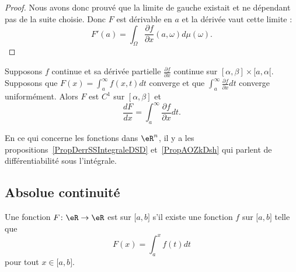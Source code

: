 \begin{proof}
        Nous avons donc prouvé que la limite de gauche existait et ne dépendant pas de la suite choisie. Donc \( F\) est dérivable en \( a\) et la dérivée vaut cette limite :
        \begin{equation}
            F'(a)=\int_{\Omega}\frac{ \partial f }{ \partial x }(a,\omega)d\mu(\omega).
        \end{equation}
\end{proof}

\begin{theorem}
		Supposons $f$ continue et sa dérivée partielle $\frac{ \partial f }{ \partial x }$ continue sur $[\alpha,\beta]\times[a,\alpha[$. Supposons que $F(x)=\int_a^{\infty}f(x,t)dt$ converge et que $\int_a^{\infty}\frac{ \partial f }{ \partial x }dt$ converge uniformément. Alors $F$ est $C^1$ sur $[\alpha,\beta]$ et
		\begin{equation}
			\frac{ dF }{ dx }=\int_a^{\infty}\frac{ \partial f }{ \partial x }dt.
		\end{equation}
\end{theorem}

En ce qui concerne les fonctions dans \( \eR^n\), il y a les  propositions~\ref{PropDerrSSIntegraleDSD} et~\ref{PropAOZkDsh} qui parlent de différentiabilité sous l'intégrale.

\subsection{Absolue continuité}

\begin{definition}      \label{DefAbsoluCont}
    Une fonction \( F\colon \eR\to \eR\) est  sur \( \mathopen[ a , b \mathclose]\) s'il existe une fonction \( f\) sur \( \mathopen[ a , b \mathclose]\) telle que
    \begin{equation}
        F(x)=\int_a^xf(t)dt
    \end{equation}
    pour tout \( x\in\mathopen[ a , b \mathclose]\).
\end{definition}

